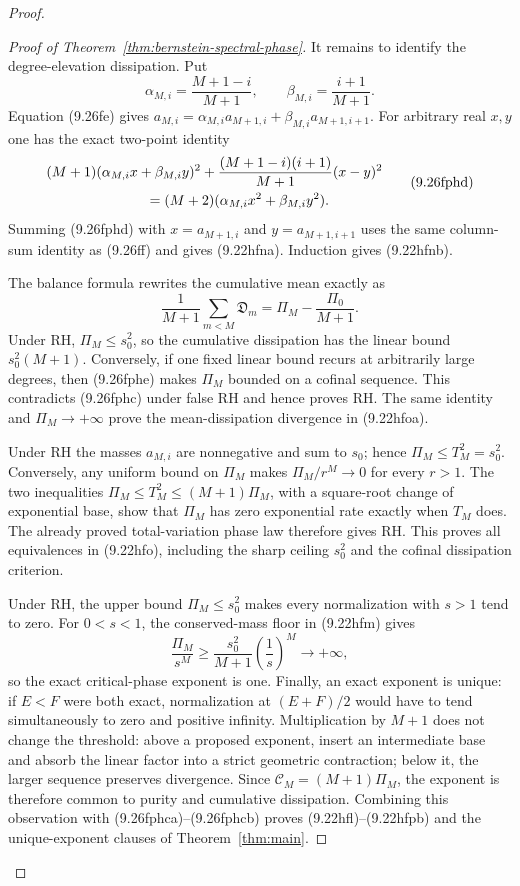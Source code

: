 \documentclass[11pt]{article}
\begin{document}
\begin{proof}
\begin{proof}[Proof of Theorem~\ref{thm:bernstein-spectral-phase}]
It remains to identify the degree-elevation dissipation.  Put
\[
 \alpha_{M,i}=\frac{M+1-i}{M+1},\qquad
 \beta_{M,i}=\frac{i+1}{M+1}.
\]
Equation \textup{(9.26fe)} gives
$a_{M,i}=\alpha_{M,i}a_{M+1,i}+\beta_{M,i}a_{M+1,i+1}$.  For arbitrary real $x,y$ one has the
exact two-point identity
\[
 \begin{aligned}
 &(M+1)(\alpha_{M,i}x+\beta_{M,i}y)^2
 +\frac{(M+1-i)(i+1)}{M+1}(x-y)^2\\
 &\hspace{25mm}=(M+2)
   (\alpha_{M,i}x^2+\beta_{M,i}y^2).
 \end{aligned}
 \tag{9.26fphd}
\]
Summing \textup{(9.26fphd)} with
$x=a_{M+1,i}$ and $y=a_{M+1,i+1}$ uses the same column-sum identity as
\textup{(9.26ff)} and gives \textup{(9.22hfna)}.  Induction gives
\textup{(9.22hfnb)}.

The balance formula rewrites the cumulative mean exactly as
\[
 \frac1{M+1}\sum_{m<M}\mathfrak D_m
 =\Pi_M-\frac{\Pi_0}{M+1}.
 \tag{9.26fphe}
\]
Under RH, $\Pi_M\le s_0^2$, so the cumulative dissipation has the linear bound
$s_0^2(M+1)$.  Conversely, if one fixed linear bound recurs at arbitrarily large degrees, then
\textup{(9.26fphe)} makes $\Pi_M$ bounded on a cofinal sequence.  This contradicts
\textup{(9.26fphc)} under false RH and hence proves RH.  The same identity and
$\Pi_M\to+\infty$ prove the mean-dissipation divergence in \textup{(9.22hfoa)}.

Under RH the masses $a_{M,i}$ are nonnegative and sum to $s_0$; hence
$\Pi_M\le T_M^2=s_0^2$.  Conversely, any uniform bound on $\Pi_M$ makes
$\Pi_M/r^M\to0$ for every $r>1$.  The two inequalities
$\Pi_M\le T_M^2\le(M+1)\Pi_M$, with a square-root change of exponential base, show that
$\Pi_M$ has zero exponential rate exactly when $T_M$ does.  The already proved total-variation
phase law therefore gives RH.  This proves all equivalences in \textup{(9.22hfo)}, including the
sharp ceiling $s_0^2$ and the cofinal dissipation criterion.

Under RH, the upper bound $\Pi_M\le s_0^2$ makes every normalization with $s>1$ tend to zero.
For $0<s<1$, the conserved-mass floor in \textup{(9.22hfm)} gives
\[
 \frac{\Pi_M}{s^M}\ge
 \frac{s_0^2}{M+1}\left(\frac1s\right)^M\longrightarrow+\infty,
\]
so the exact critical-phase exponent is one.  Finally, an exact exponent is unique: if
$E<F$ were both exact, normalization at $(E+F)/2$ would have to tend simultaneously to zero and
positive infinity.  Multiplication by $M+1$ does not change the threshold: above a proposed
exponent, insert an intermediate base and absorb the linear factor into a strict geometric
contraction; below it, the larger sequence preserves divergence.  Since
$\mathcal C_M=(M+1)\Pi_M$, the exponent is therefore common to purity and cumulative
dissipation.  Combining this observation with
\textup{(9.26fphca)}--\textup{(9.26fphcb)} proves
\textup{(9.22hfl)}--\textup{(9.22hfpb)} and the unique-exponent clauses of
Theorem~\ref{thm:main}.
\end{proof}


\end{proof}
\end{document}
